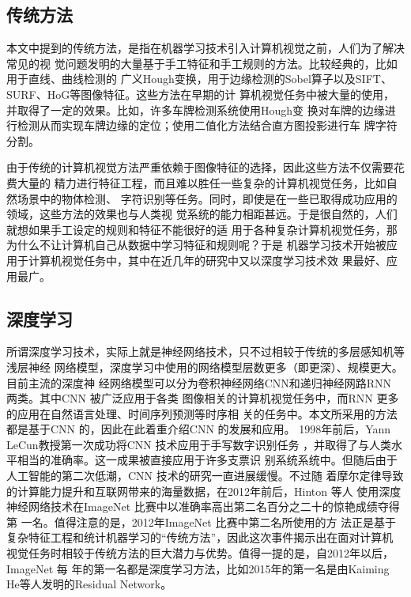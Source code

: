 \subsection{传统方法}

本文中提到的传统方法，是指在机器学习技术引入计算机视觉之前，人们为了解决常见的视
觉问题发明的大量基于手工特征和手工规则的方法。比较经典的，比如用于直线、曲线检测的
广义Hough变换，用于边缘检测的Sobel算子以及SIFT、SURF、HoG等图像特征。这些方法在早期的计
算机视觉任务中被大量的使用，并取得了一定的效果。比如，许多车牌检测系统使用Hough变
换对车牌的边缘进行检测从而实现车牌边缘的定位；使用二值化方法结合直方图投影进行车
牌字符分割。

由于传统的计算机视觉方法严重依赖于图像特征的选择，因此这些方法不仅需要花费大量的
精力进行特征工程，而且难以胜任一些复杂的计算机视觉任务，比如自然场景中的物体检测、
字符识别等任务。同时，即使是在一些已取得成功应用的领域，这些方法的效果也与人类视
觉系统的能力相距甚远。于是很自然的，人们就想如果手工设定的规则和特征不能很好的适
用于各种复杂计算机视觉任务，那为什么不让计算机自己从数据中学习特征和规则呢？于是
机器学习技术开始被应用于计算机视觉任务中，其中在近几年的研究中又以深度学习技术效
果最好、应用最广。

\subsection{深度学习}

所谓深度学习技术，实际上就是神经网络技术，只不过相较于传统的多层感知机等浅层神经
网络模型，深度学习中使用的网络模型层数更多（即更深）、规模更大。目前主流的深度神
经网络模型可以分为卷积神经网络CNN和递归神经网路RNN 两类。其中CNN 被广泛应用于各类
图像相关的计算机视觉任务中，而RNN 更多的应用在自然语言处理、时间序列预测等时序相
关的任务中。本文所采用的方法都是基于CNN 的，因此在此着重介绍CNN 的发展和应用。
1998年前后，Yann LeCun教授第一次成功将CNN 技术应用于手写数字识别任务
\cite{LeCun:1990vp}，并取得了与人类水平相当的准确率。这一成果被直接应用于许多支票识
别系统系统中。但随后由于人工智能的第二次低潮，CNN 技术的研究一直进展缓慢。不过随
着摩尔定律导致的计算能力提升和互联网带来的海量数据，在2012年前后，Hinton 等人
使用深度神经网络技术在ImageNet 比赛中以准确率高出第二名百分之二十的惊艳成绩夺得第
一名\cite{Krizhevsky:2012wl}。值得注意的是，2012年ImageNet 比赛中第二名所使用的方
法正是基于复杂特征工程和统计机器学习的“传统方法”，因此这次事件揭示出在面对计算机
视觉任务时相较于传统方法的巨大潜力与优势。值得一提的是，自2012年以后，ImageNet 每
年的第一名都是深度学习方法，比如2015年的第一名是由Kaiming He等人发明的Residual
Network\cite{He:2015tt}。

